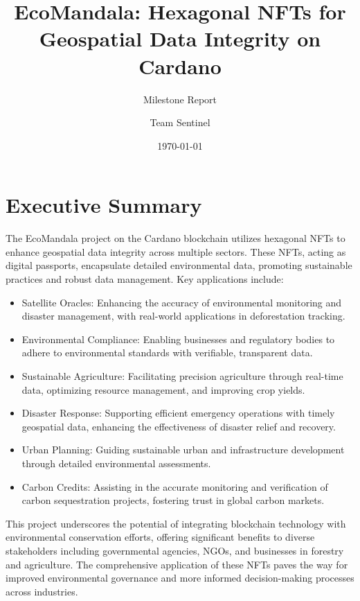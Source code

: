 \documentclass{scrreport}
\title{EcoMandala: Hexagonal NFTs for Geospatial Data Integrity on Cardano}
\subtitle{Milestone Report}
\author{Team Sentinel}
\date{\today}
\begin{document}
\maketitle

\tableofcontents

\chapter*{Executive Summary}
\label{chap:executive summary}

The EcoMandala project on the Cardano blockchain utilizes hexagonal NFTs to enhance geospatial data integrity across multiple sectors. These NFTs, acting as digital passports, encapsulate detailed environmental data, promoting sustainable practices and robust data management. Key applications include:
\begin{itemize}
    \item Satellite Oracles: Enhancing the accuracy of environmental monitoring and disaster management, with real-world applications in deforestation tracking.
    \item Environmental Compliance: Enabling businesses and regulatory bodies to adhere to environmental standards with verifiable, transparent data.
    \item Sustainable Agriculture: Facilitating precision agriculture through real-time data, optimizing resource management, and improving crop yields.
    \item Disaster Response: Supporting efficient emergency operations with timely geospatial data, enhancing the effectiveness of disaster relief and recovery.
    \item Urban Planning: Guiding sustainable urban and infrastructure development through detailed environmental assessments.
    \item Carbon Credits: Assisting in the accurate monitoring and verification of carbon sequestration projects, fostering trust in global carbon markets.
    
\end{itemize}


This project underscores the potential of integrating blockchain technology with environmental conservation efforts, offering significant benefits to diverse stakeholders including governmental agencies, NGOs, and businesses in forestry and agriculture. The comprehensive application of these NFTs paves the way for improved environmental governance and more informed decision-making processes across industries.
\end{document}

